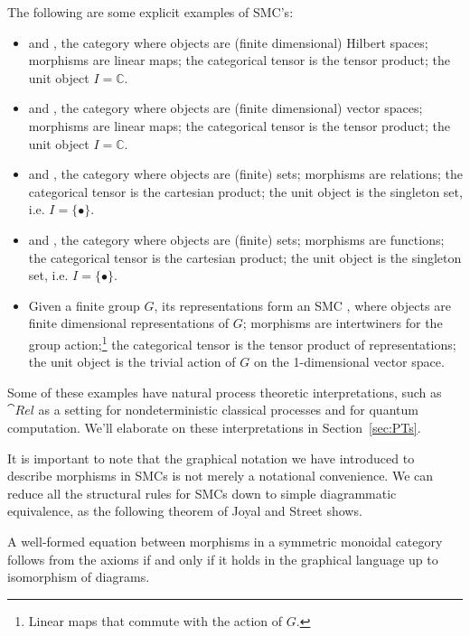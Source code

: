 \begin{examples}
\label{ex:smcs}
The following are some explicit examples of SMC's:
\begin{itemize}
\item {} and , the category where objects are (finite dimensional) Hilbert spaces; morphisms are linear maps; the categorical tensor is the tensor product; the unit object $I=\mathbb{C}$.

\item {} and , the category where objects are (finite dimensional) vector spaces; morphisms are linear maps; the categorical tensor is the tensor product; the unit object $I=\mathbb{C}$.

\item {} and , the category where objects are (finite) sets; morphisms are relations; the categorical tensor is the cartesian product; the unit object is the singleton set, i.e. $I=\{\bullet\}$.

\item {} and , the category where objects are (finite) sets; morphisms are functions; the categorical tensor is the cartesian product; the unit object is the singleton set, i.e. $I=\{\bullet\}$.

\item Given a finite group $G$, its representations form an SMC , where objects are finite dimensional representations of $G$; morphisms are intertwiners for the group action;\footnote{Linear maps that commute with the action of $G$.} the categorical tensor is the tensor product of representations; the unit object is the trivial action of $G$ on the 1-dimensional vector space.
\end{itemize}
\end{examples}

Some of these examples have natural process theoretic interpretations, such as $\cat{Rel}$ as a setting for nondeterministic classical processes and  for quantum computation. We'll elaborate on these interpretations in Section~\ref{sec:PTs}.

It is important to note that the graphical notation we have introduced to describe morphisms in SMCs is not merely a notational convenience. We can reduce all the structural rules for SMCs down to simple diagrammatic equivalence, as the following theorem of Joyal and Street shows.

\begin{theorem}{\cite[Thm 2.3]{joyal1991geometry}}
A well-formed equation between morphisms in a symmetric monoidal category follows from the axioms if and only if it holds in the graphical language up to isomorphism of diagrams.
\end{theorem}

